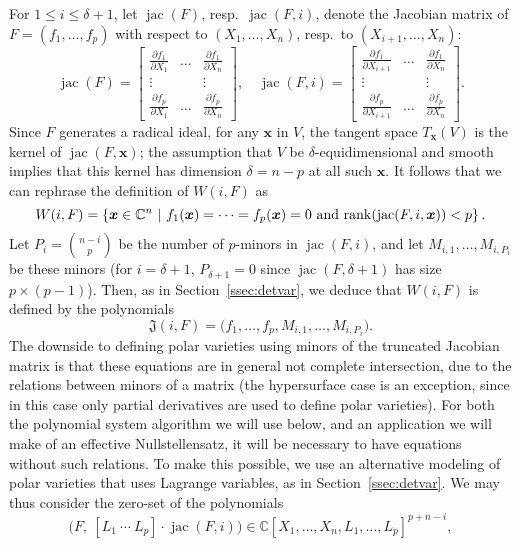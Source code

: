 \documentclass[12pt]{article}
\def\frkJ{\mathfrak{J}}
\def\xb{{\bm x}}
\DeclareMathOperator{\jac}{jac}
\def\pa{\partial}
\def\C{\mathbb{C}}
\begin{document}
For $1\le i \le \delta+1$, let $\jac(F)$, resp.\ $\jac(F, i)$, denote the
Jacobian matrix of $F=(f_1,\hdots,f_p)$ with respect to
$(X_{1},\hdots,X_n)$, resp.\ to $(X_{i+1},\hdots,X_n):$
\[
\jac(F)=
\left[ 
\begin{array}{ccc}
\frac{\pa f_1}{\pa X_{1}}&\hdots& \frac{\pa f_1}{\pa X_{n}} \\
\vdots& &\vdots\\
\frac{\pa f_p}{\pa X_{1}}&\hdots& \frac{\pa f_p}{\pa X_{n}} 
\end{array}
\right ],
\quad
\jac(F, i)=
\left[ 
\begin{array}{ccc}
\frac{\pa f_1}{\pa X_{i+1}}&\hdots& \frac{\pa f_1}{\pa X_{n}} \\
\vdots& &\vdots\\
\frac{\pa f_p}{\pa X_{i+1}}&\hdots& \frac{\pa f_p}{\pa X_{n}} 
\end{array}
\right]. 
\]
Since $F$ generates a radical ideal, for any $\xb$ in $V$, the tangent
space $T_\xb(V)$ is the kernel of $\jac(F,\xb)$; the assumption that
$V$ be $\delta$-equidimensional and smooth implies that this kernel
has dimension $\delta=n-p$ at all such $\xb$. It follows that 
we can rephrase the definition of $W(i,F)$ as
\[W(i,F) = \left\{\xb \in \C^n~|~ f_1(\xb)=\cdots=f_p(\xb)=0 
\text{~and~} {\rm rank}(\jac(F,i,\xb)) < p\right\}.\] Let $P_i
=\binom{n-i}{p}$ be the number of $p$-minors in $\jac(F,i)$, and let
$M_{i,1},\hdots,M_{i,P_i}$ be these minors (for $i=\delta+1$,
$P_{\delta+1}=0$ since $\jac(F,{\delta+1})$ has size $p \times
(p-1)$). Then, as in Section~\ref{ssec:detvar}, we deduce that
$W(i,F)$ is defined by the polynomials
\begin{equation}\label{eq:frkJ}
\frkJ(i,F) = \big(f_1,\hdots,f_p,M_{i,1},\hdots,M_{i,P_{i}}\big).  
\end{equation}
The downside to defining polar varieties using minors of the truncated
Jacobian matrix is that these equations are in general not complete
intersection, due to the relations between minors of a matrix (the
hypersurface case is an exception, since in this case only partial
derivatives are used to define polar varieties). For both the
polynomial system algorithm we will use below, and an application we
will make of an effective Nullstellensatz, it will be necessary to
have equations without such relations. To make this possible, we use
an alternative modeling of polar varieties that uses Lagrange
variables, as in Section~\ref{ssec:detvar}. We may thus consider the zero-set of the polynomials
\[ \big(F,\ [L_1~\cdots~L_p]\cdot \jac(F, i)\big ) \in \C[X_1,\dots,X_n,L_1,\dots,L_p]^{p+n-i},\]
\end{document}
